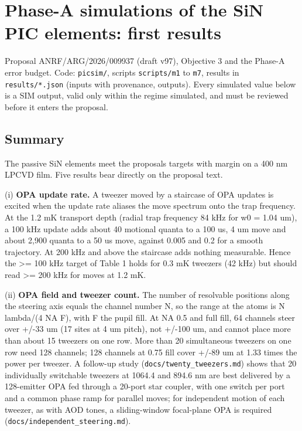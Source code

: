 \hypertarget{phase-a-simulations-of-the-sin-pic-elements-first-results}{%
\chapter{Phase-A simulations of the SiN PIC elements: first
results}\label{findings-phase-a-simulations-of-the-sin-pic-elements-first-results}}

Proposal ANRF/ARG/2026/009937 (draft v97), Objective 3 and the Phase-A
error budget. Code: \texttt{picsim/}, scripts \texttt{scripts/m1} to
\texttt{m7}, results in \texttt{results/*.json} (inputs with provenance,
outputs). Every simulated value below is a SIM output, valid only within
the regime simulated, and must be reviewed before it enters the
proposal.

\hypertarget{1-summary}{%
\section{Summary}\label{findings-1-summary}}

The passive SiN elements meet the proposal\textquotesingle s targets
with margin on a 400 nm LPCVD film. Five results bear directly on the
proposal text.

(i) \textbf{OPA update rate.} A tweezer moved by a staircase of OPA
updates is excited when the update rate aliases the move spectrum onto
the trap frequency. At the 1.2 mK transport depth (radial trap frequency
84 kHz for w0 = 1.04 um), a 100 kHz update adds about 40 motional quanta
to a 100 us, 4 um move and about 2,900 quanta to a 50 us move, against
0.005 and 0.2 for a smooth trajectory. At 200 kHz and above the
staircase adds nothing measurable. Hence the \textgreater= 100 kHz
target of Table 1 holds for 0.3 mK tweezers (42 kHz) but should read
\textgreater= 200 kHz for moves at 1.2 mK.

(ii) \textbf{OPA field and tweezer count.} The number of resolvable
positions along the steering axis equals the channel number N, so the
range at the atoms is N lambda/(4 NA F), with F the pupil fill. At NA
0.5 and full fill, 64 channels steer over +/-33 um (17 sites at 4 um
pitch), not +/-100 um, and cannot place more than about 15 tweezers on
one row. More than 20 simultaneous tweezers on one row need 128
channels; 128 channels at 0.75 fill cover +/-89 um at 1.33 times the
power per tweezer. A follow-up study (\texttt{docs/twenty\_tweezers.md})
shows that 20 individually switchable tweezers at 1064.4 and 894.6 nm
are best delivered by a 128-emitter OPA fed through a 20-port star
coupler, with one switch per port and a common phase ramp for parallel
moves; for independent motion of each tweezer, as with AOD tones, a
sliding-window focal-plane OPA is required
(\texttt{docs/independent\_steering.md}).

